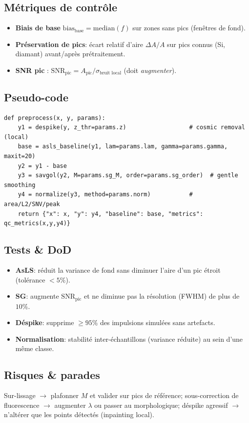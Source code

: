 \subsection{Métriques de contrôle}
\begin{itemize}[nosep]
\item \textbf{Biais de base} $\mathrm{bias}_{\mathrm{base}} = \mathrm{median}(f)$ sur zones sans pics (fenêtres de fond).
\item \textbf{Préservation de pics}: écart relatif d'aire $\Delta A/A$ sur pics connus (Si, diamant) avant/après prétraitement.
\item \textbf{SNR pic} : $\mathrm{SNR}_{\mathrm{pic}} = A_{\mathrm{pic}}/\sigma_{\text{bruit local}}$ (doit \emph{augmenter}).
\end{itemize}

\subsection{Pseudo-code}
\begin{lstlisting}[basicstyle=\ttfamily\small]
def preprocess(x, y, params):
    y1 = despike(y, z_thr=params.z)                  # cosmic removal (local)
    base = asls_baseline(y1, lam=params.lam, gamma=params.gamma, maxit=20)
    y2 = y1 - base
    y3 = savgol(y2, M=params.sg_M, order=params.sg_order)  # gentle smoothing
    y4 = normalize(y3, method=params.norm)           # area/L2/SNV/peak
    return {"x": x, "y": y4, "baseline": base, "metrics": qc_metrics(x,y,y4)}
\end{lstlisting}

\subsection{Tests \& DoD}
\begin{itemize}[nosep]
\item \textbf{AsLS}: réduit la variance de fond sans diminuer l'aire d'un pic étroit (tolérance $<5\%$).
\item \textbf{SG}: augmente $\mathrm{SNR}_{\mathrm{pic}}$ et ne diminue pas la résolution (FWHM) de plus de $10\%$.
\item \textbf{Déspike}: supprime $\ge 95\%$ des impulsions simulées sans artefacts.
\item \textbf{Normalisation}: stabilité inter-échantillons (variance réduite) au sein d'une même classe.
\end{itemize}

\subsection{Risques \& parades}
Sur-lissage $\rightarrow$ plafonner $M$ et valider sur pics de référence; sous-correction de fluorescence $\rightarrow$ augmenter $\lambda$ ou passer au morphologique; déspike agressif $\rightarrow$ n'altérer que les points détectés (inpainting local).
